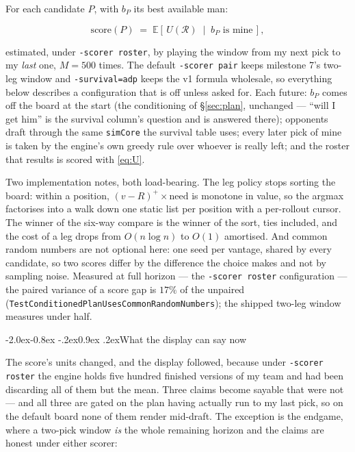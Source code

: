 \documentclass[10pt,a4paper]{article}
\makeatletter
\theoremstyle{plain}
\theoremstyle{definition}
\theoremstyle{remark}
\newcommand{\code}[1]{\texttt{\small #1}}
\renewcommand\subsection{\@startsection{subsection}{2}{\z@}%
  {-2.0ex\@plus -0.8ex \@minus -.2ex}{0.9ex \@plus .2ex}{\normalfont\large\bfseries}}
\makeatother
\begin{document}
For each candidate $P$, with $b_P$ its best available man:

\begin{equation}
\mathrm{score}(P) \;=\; \mathbb{E}\!\left[\, U(\mathcal{R}) \;\middle|\; b_P \text{ is
mine} \,\right],
\label{eq:rosterscore}
\end{equation}

estimated, under \code{-scorer roster}, by playing the window from my next pick to my
\emph{last} one, $M = 500$ times. The default \code{-scorer pair} keeps milestone 7's
two-leg window and \code{-survival=adp} keeps the v1 formula wholesale, so everything below
describes a configuration that is off unless asked for. Each
future: $b_P$ comes off the board at the start (the conditioning of \S\ref{sec:plan},
unchanged --- ``will I get him'' is the survival column's question and is answered there);
opponents draft through the same \code{simCore} the survival table uses; every later pick
of mine is taken by the engine's own greedy rule over whoever is really left; and the
roster that results is scored with \eqref{eq:U}.

Two implementation notes, both load-bearing. The leg policy stops sorting the board: within
a position, $(v - R)^+ \times \mathrm{need}$ is monotone in value, so the argmax
factorises into a walk down one static list per position with a per-rollout cursor. The
winner of the six-way compare is the winner of the sort, ties included, and the cost of a
leg drops from $O(n \log n)$ to $O(1)$ amortised. And common random numbers are not
optional here: one seed per vantage, shared by every candidate, so two scores differ by the
difference the choice makes and not by sampling noise. Measured at full horizon --- the \code{-scorer roster}
configuration --- the paired variance of a score gap is $17\%$ of the unpaired
(\code{TestConditionedPlanUsesCommonRandomNumbers}); the shipped two-leg window measures
under half.

\subsection{What the display can say now}

The score's units changed, and the display followed, because under \code{-scorer roster}
the engine holds five hundred finished versions of my team and had been discarding all of
them but the mean. Three claims become sayable that were not --- and all three are gated on
the plan having actually run to my last pick, so on the default board none of them render
mid-draft. The exception is the endgame, where a two-pick window \emph{is} the whole
remaining horizon and the claims are honest under either scorer:
\end{document}
